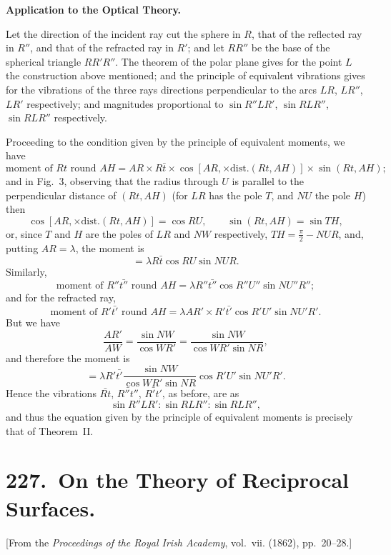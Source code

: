 \documentclass[11pt,a4paper]{book}
\theoremstyle{plain}
\begin{document}
\bigskip

\textbf{Application to the Optical Theory.}

Let the direction of the incident ray cut the sphere in $R$, that of the reflected ray in $R''$, and that of the refracted ray in $R'$; and let $RR''$ be the base of the spherical triangle $RR'R''$. The theorem of the polar plane gives for the point $L$ the construction above mentioned; and the principle of equivalent vibrations gives for the vibrations of the three rays directions perpendicular to the arcs $LR$, $LR''$, $LR'$ respectively; and magnitudes proportional to $\sin R''LR'$, $\sin RLR''$, $\sin RLR''$ respectively.

Proceeding to the condition given by the principle of equivalent moments, we have
\[
\text{moment of }Rt\text{ round }AH=AR\times R\bar{t}\times\cos[AR,\times\text{dist.}(Rt,AH)]\times\sin(Rt,AH);
\]
and in Fig.~3, observing that the radius through $U$ is parallel to the perpendicular distance of $(Rt,AH)$ (for $LR$ has the pole $T$, and $NU$ the pole $H$) then
\[
\cos[AR,\times\text{dist.}(Rt,AH)]=\cos RU,\qquad \sin(Rt,AH)=\sin TH,
\]
or, since $T$ and $H$ are the poles of $LR$ and $NW$ respectively, $TH=\frac{\pi}{2}-NUR$, and, putting $AR=\lambda$, the moment is
\[
=\lambda R\bar{t}\cos RU\sin NUR.
\]
Similarly,
\[
\text{moment of }R''\bar{t''}\text{ round }AH=\lambda R''\bar{t''}\cos R''U''\sin NU''R'';
\]
and for the refracted ray,
\[
\text{moment of }R'\bar{t'}\text{ round }AH=\lambda AR'\times R'\bar{t'}\cos R'U'\sin NU'R'.
\]
But we have
\[
\frac{AR'}{AW}=\frac{\sin NW}{\cos WR'}=\frac{\sin NW}{\cos WR'\sin NR},
\]
and therefore the moment is
\[
=\lambda R'\bar{t'}\frac{\sin NW}{\cos WR'\sin NR}\cos R'U'\sin NU'R'.
\]
Hence the vibrations $\bar{Rt}$, $\bar{R''t''}$, $\bar{R't'}$, as before, are as
\[
\sin R''LR':\sin RLR'':\sin RLR'',
\]
and thus the equation given by the principle of equivalent moments is precisely that of Theorem~II.
\newpage

\chapter[On the Theory of Reciprocal Surfaces]{227.\ On the Theory of Reciprocal Surfaces.}
\label{paper227}

\begin{center}
\small
[From the \textit{Proceedings of the Royal Irish Academy}, vol.~vii. (1862), pp.~20--28.]
\end{center}
\end{document}
